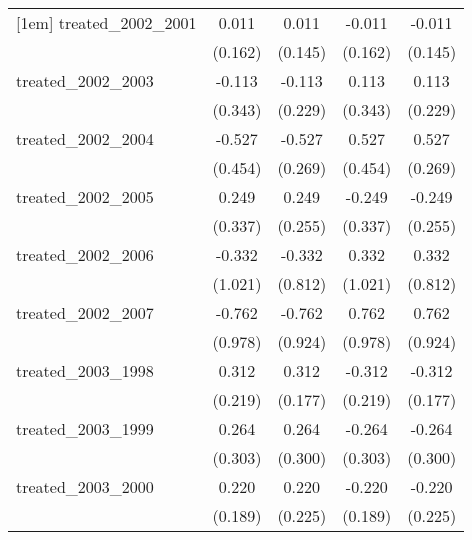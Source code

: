 {\begin{tabular}{l*{4}{c}}
[1em]
treated\_2002\_2001&       0.011         &       0.011         &      -0.011         &      -0.011         \\
            &     (0.162)         &     (0.145)         &     (0.162)         &     (0.145)         \\
[1em]
treated\_2002\_2003&      -0.113         &      -0.113         &       0.113         &       0.113         \\
            &     (0.343)         &     (0.229)         &     (0.343)         &     (0.229)         \\
[1em]
treated\_2002\_2004&      -0.527         &      -0.527\sym{*}  &       0.527         &       0.527\sym{*}  \\
            &     (0.454)         &     (0.269)         &     (0.454)         &     (0.269)         \\
[1em]
treated\_2002\_2005&       0.249         &       0.249         &      -0.249         &      -0.249         \\
            &     (0.337)         &     (0.255)         &     (0.337)         &     (0.255)         \\
[1em]
treated\_2002\_2006&      -0.332         &      -0.332         &       0.332         &       0.332         \\
            &     (1.021)         &     (0.812)         &     (1.021)         &     (0.812)         \\
[1em]
treated\_2002\_2007&      -0.762         &      -0.762         &       0.762         &       0.762         \\
            &     (0.978)         &     (0.924)         &     (0.978)         &     (0.924)         \\
[1em]
treated\_2003\_1998&       0.312         &       0.312         &      -0.312         &      -0.312         \\
            &     (0.219)         &     (0.177)         &     (0.219)         &     (0.177)         \\
[1em]
treated\_2003\_1999&       0.264         &       0.264         &      -0.264         &      -0.264         \\
            &     (0.303)         &     (0.300)         &     (0.303)         &     (0.300)         \\
[1em]
treated\_2003\_2000&       0.220         &       0.220         &      -0.220         &      -0.220         \\
            &     (0.189)         &     (0.225)         &     (0.189)         &     (0.225)         \\

\end{tabular}}
